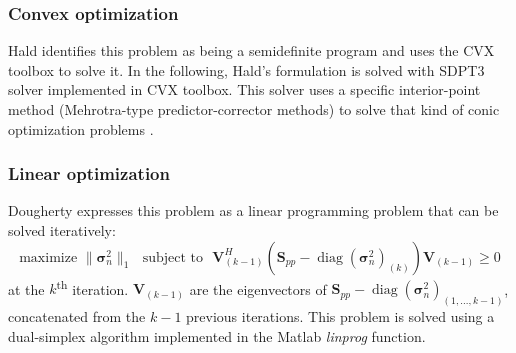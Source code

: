 \documentclass[fontsize=12pt,DIV13,paper=a4,abstract=true,titlepage=false]{scrartcl}
\newcommand{\diag}[1]{\operatorname{diag}\left(#1\right)}
\begin{document}
 \subsubsection{Convex optimization} 
 Hald \citep{Hald2017} identifies this problem as being a semidefinite program and uses the CVX toolbox \cite{cvx,Grant_cvx} to solve it. In the following, Hald's formulation is solved with SDPT3 solver implemented in CVX toolbox. This solver uses  a specific interior-point method (Mehrotra-type predictor-corrector methods) to solve that kind of conic optimization problems \citep{Tuetuencue2003}.

\subsubsection{Linear optimization}
Dougherty \citep{dougherty2016} expresses this problem as a linear programming problem that can be solved iteratively:
\begin{equation}
	\text{maximize~} \| \bm{\sigma}_{n}^2\|_1   \text{~~subject to~~}  \bm{V}^{H}_{(k-1)} \left( \bm{S}_{pp}- \diag{\bm{\sigma}_n^2}_{(k)} \right) \bm{V}_{(k-1)} \geq 0 
\end{equation}
at the $k$\textsuperscript{th} iteration. $\bm{V}_{(k-1)}$ are the eigenvectors of $\bm{S}_{pp}-\diag{\bm{\sigma}_n^2}_{(1,...,k-1)} $, concatenated  from the $k-1$ previous iterations. This problem is solved using a dual-simplex algorithm implemented in the Matlab \textit{linprog} function.
 
\end{document}
